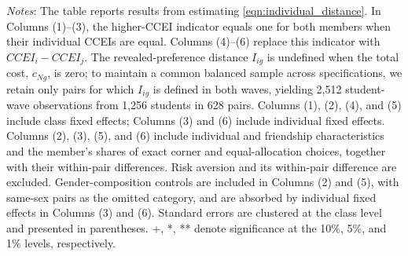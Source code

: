 \documentclass[11 pt]{article}
\begin{document}
\begin{table}[h!]
\centering
\caption{Individual Rationality and Revealed-Preference Distance from Group Choices}
\label{tab:pref_agg_ccei}
\begin{minipage}{\textwidth}
{\footnotesize \emph{Notes}: The table reports results from estimating \autoref{eqn:individual_distance}. In Columns (1)--(3), the higher-CCEI indicator equals one for both members when their individual CCEIs are equal. Columns (4)--(6) replace this indicator with $CCEI_i-CCEI_j$. The revealed-preference distance $I_{ig}$ is undefined when the total cost, $c_{Ng}$, is zero; to maintain a common balanced sample across specifications, we retain only pairs for which $I_{ig}$ is defined in both waves, yielding 2,512 student-wave observations from 1,256 students in 628 pairs. Columns (1), (2), (4), and (5) include class fixed effects; Columns (3) and (6) include individual fixed effects. Columns (2), (3), (5), and (6) include individual and friendship characteristics and the member's shares of exact corner and equal-allocation choices, together with their within-pair differences. Risk aversion and its within-pair difference are excluded. Gender-composition controls are included in Columns (2) and (5), with same-sex pairs as the omitted category, and are absorbed by individual fixed effects in Columns (3) and (6). Standard errors are clustered at the class level and presented in parentheses. +, *, ** denote significance at the 10\%, 5\%, and 1\% levels, respectively.}
\end{minipage}
\end{table}
\end{document}

